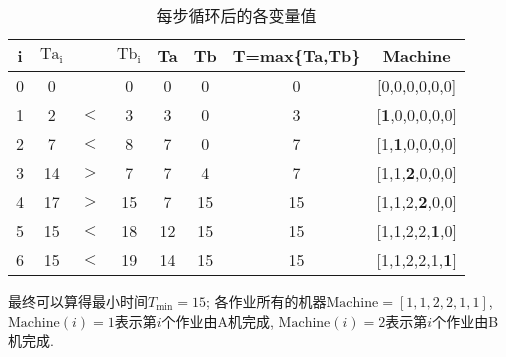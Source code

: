 \begin{solution}
\begin{table}[!htb]
\caption{\label{variable}每步循环后的各变量值}
\begin{tabular}{|l|lll|l|l|l|l|}
\hline
\multicolumn{1}{|c|}{i} & \multicolumn{1}{c}{$\mathrm{Ta_i}$} & \multicolumn{1}{c}{} & \multicolumn{1}{c|}{$\mathrm{Tb_i}$} & \multicolumn{1}{c|}{Ta} & \multicolumn{1}{c|}{Tb} & \multicolumn{1}{c|}{T=max\{Ta,Tb\}} & \multicolumn{1}{c|}{Machine} \\
\hline
\multicolumn{1}{|c|}{0} & \multicolumn{1}{c}{0} & \multicolumn{1}{c}{} & \multicolumn{1}{c|}{0} & \multicolumn{1}{c|}{0} & \multicolumn{1}{c|}{0} & \multicolumn{1}{c|}{0} & \multicolumn{1}{c|}{[0,0,0,0,0,0]} \\
\hline
\multicolumn{1}{|c|}{1} & \multicolumn{1}{c}{2} & \multicolumn{1}{c}{$<$} & \multicolumn{1}{c|}{3} & \multicolumn{1}{c|}{3} & \multicolumn{1}{c|}{0} & \multicolumn{1}{c|}{3} & \multicolumn{1}{c|}{[\textbf{1},0,0,0,0,0]} \\
\cline{1-1}\cline{5-8}
\multicolumn{1}{|c|}{2} & \multicolumn{1}{c}{7} & \multicolumn{1}{c}{$<$} & \multicolumn{1}{c|}{8} & \multicolumn{1}{c|}{7} & \multicolumn{1}{c|}{0} & \multicolumn{1}{c|}{7} & \multicolumn{1}{c|}{[1,\textbf{1},0,0,0,0]} \\
\cline{1-1}\cline{5-8}
\multicolumn{1}{|c|}{3} & \multicolumn{1}{c}{14} & \multicolumn{1}{c}{$>$} & \multicolumn{1}{c|}{7} & \multicolumn{1}{c|}{7} & \multicolumn{1}{c|}{4} & \multicolumn{1}{c|}{7} & \multicolumn{1}{c|}{[1,1,\textbf{2},0,0,0]} \\
\cline{1-1}\cline{5-8}
\multicolumn{1}{|c|}{4} & \multicolumn{1}{c}{17} & \multicolumn{1}{c}{$>$} & \multicolumn{1}{c|}{15} & \multicolumn{1}{c|}{7} & \multicolumn{1}{c|}{15} & \multicolumn{1}{c|}{15} & \multicolumn{1}{c|}{[1,1,2,\textbf{2},0,0]} \\
\cline{1-1}\cline{5-8}
\multicolumn{1}{|c|}{5} & \multicolumn{1}{c}{15} & \multicolumn{1}{c}{$<$} & \multicolumn{1}{c|}{18} & \multicolumn{1}{c|}{12} & \multicolumn{1}{c|}{15} & \multicolumn{1}{c|}{15} & \multicolumn{1}{c|}{[1,1,2,2,\textbf{1},0]} \\
\cline{1-1}\cline{5-8}
\multicolumn{1}{|c|}{6} & \multicolumn{1}{c}{15} & \multicolumn{1}{c}{$<$} & \multicolumn{1}{c|}{19} & \multicolumn{1}{c|}{14} & \multicolumn{1}{c|}{15} & \multicolumn{1}{c|}{15} & \multicolumn{1}{c|}{[1,1,2,2,1,\textbf{1}]} \\
\hline
\end{tabular}
\end{table}

最终可以算得最小时间$T_{\min} = 15$; 各作业所有的机器$\textrm{Machine}=[1,1,2,2,1,1]$, $\textrm{Machine}(i)= 1$表示第$i$个作业由A机完成, $\textrm{Machine}(i)= 2$表示第$i$个作业由B机完成.

\end{solution}
